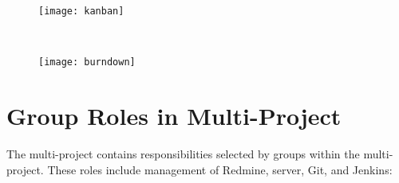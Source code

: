 \begin{figure}
\centering
\begin{minipage}{.47\textwidth}
  \centering
  \texttt{[image: kanban]}
  \label{fig:kanban_board}
\end{minipage}
~~~~~
\begin{minipage}{.47\textwidth}
  \centering
  \texttt{[image: burndown]}
  \label{fig:burndown_chart}
\end{minipage}
\end{figure}

\section{Group Roles in Multi-Project}\label{sec:multi_project_group_roles}
The multi-project contains responsibilities selected by groups within the multi-project. These roles include management of Redmine, server, Git, and Jenkins:

